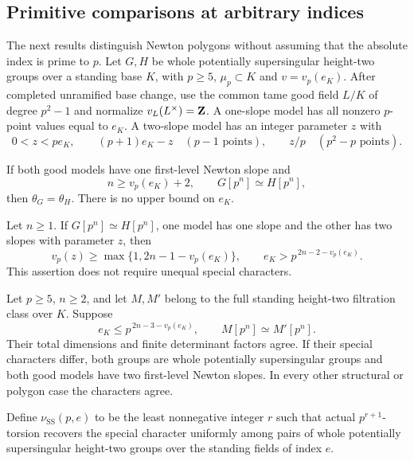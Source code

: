 \subsection{Primitive comparisons at arbitrary indices}
The next results distinguish Newton polygons without assuming that the absolute index is prime to $p$. Let $G,H$ be whole potentially supersingular height-two groups over a standing base $K$, with $p\ge5$, $\mu_p\subset K$ and $v=v_p(e_K)$. After completed unramified base change, use the common tame good field $L/K$ of degree $p^2-1$ and normalize $v_L(L^\times)=\mathbf Z$. A one-slope model has all nonzero $p$-point values equal to $e_K$. A two-slope model has an integer parameter $z$ with
\[
 0<z<pe_K,\qquad
 (p+1)e_K-z\quad(p-1\text{ points}),\qquad
 z/p\quad(p^2-p\text{ points}).
\]

\begin{theorem}\label{thm:one-slope-all-indices}
If both good models have one first-level Newton slope and
\[
 n\ge v_p(e_K)+2,\qquad G[p^n]\simeq H[p^n],
\]
then $\theta_G=\theta_H$. There is no upper bound on $e_K$.
\end{theorem}

\begin{theorem}\label{thm:mixed-polygon-obstruction}
Let $n\ge1$. If $G[p^n]\simeq H[p^n]$, one model has one slope and the other has two slopes with parameter $z$, then
\begin{equation}\label{eq:mixed-polygon-obstruction}
 v_p(z)\ge\max\{1,2n-1-v_p(e_K)\},\qquad
 e_K>p^{\,2n-2-v_p(e_K)}.
\end{equation}
This assertion does not require unequal special characters.
\end{theorem}

\begin{corollary}\label{cor:all-index-two-slope-reduction}
Let $p\ge5$, $n\ge2$, and let $M,M'$ belong to the full standing height-two filtration class over $K$. Suppose
\[
 e_K\le p^{\,2n-3-v_p(e_K)},\qquad M[p^n]\simeq M'[p^n].
\]
Their total dimensions and finite determinant factors agree. If their special characters differ, both groups are whole potentially supersingular groups and both good models have two first-level Newton slopes. In every other structural or polygon case the characters agree.
\end{corollary}

Define $\nu_{\mathrm{SS}}(p,e)$ to be the least nonnegative integer $r$ such that actual $p^{r+1}$-torsion recovers the special character uniformly among pairs of whole potentially supersingular height-two groups over the standing fields of index $e$.

